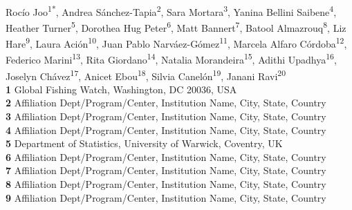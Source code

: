 \documentclass[10pt,letterpaper]{article}
\begin{document}
\vspace*{0.2in}

\begin{flushleft}
{\Large
\textbf{} %
}
\newline
\\
Rocío Joo\textsuperscript{1*\Yinyang}, 
Andrea Sánchez-Tapia\textsuperscript{2\Yinyang},
Sara Mortara\textsuperscript{3},
Yanina Bellini Saibene\textsuperscript{4},
Heather Turner\textsuperscript{5}, %
Dorothea Hug Peter\textsuperscript{6}, %
Matt Bannert\textsuperscript{7},
Batool Almazrouq\textsuperscript{8},
Liz Hare\textsuperscript{9},
Laura Ación\textsuperscript{10},
Juan Pablo Narváez-Gómez\textsuperscript{11},
Marcela Alfaro Córdoba\textsuperscript{12},
Federico Marini\textsuperscript{13},
Rita Giordano\textsuperscript{14},
Natalia Morandeira\textsuperscript{15},
Adithi Upadhya\textsuperscript{16},
Joselyn Chávez\textsuperscript{17},
Anicet Ebou\textsuperscript{18},
Silvia Canelón\textsuperscript{19},
Janani Ravi\textsuperscript{20}
\\
\bigskip
\textbf{1} Global Fishing Watch, Washington, DC 20036, USA
\\
\textbf{2} Affiliation Dept/Program/Center, Institution Name, City, State, Country
\\
\textbf{3} Affiliation Dept/Program/Center, Institution Name, City, State, Country
\\
\textbf{4} Affiliation Dept/Program/Center, Institution Name, City, State, Country
\\
\textbf{5} Department of Statistics, University of Warwick, Coventry, UK
\\
\textbf{6} Affiliation Dept/Program/Center, Institution Name, City, State, Country
\\
\textbf{7} Affiliation Dept/Program/Center, Institution Name, City, State, Country
\\
\textbf{8} Affiliation Dept/Program/Center, Institution Name, City, State, Country
\\
\textbf{9} Affiliation Dept/Program/Center, Institution Name, City, State, Country
\\

\end{flushleft}
\end{document}
